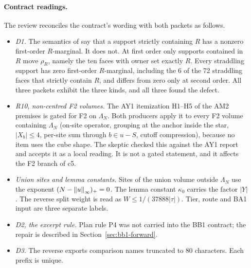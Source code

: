 \paragraph{Contract readings.} The review reconciles the contract's wording
with both packets as follows.
\begin{itemize}
\item \emph{D1.} The semantics of  say
 that a support strictly containing $R$ has a nonzero first-order
 $R$-marginal. It does not. At first order only supports contained in $R$
 move $\rho_R$, namely the ten faces with owner set exactly $R$. Every
 straddling support has zero first-order $R$-marginal, including the 6 of
 the 72 straddling faces that strictly contain $R$, and differs from zero
 only at second order. All three packets exhibit the three kinds, and all
 three found the defect.
\item \emph{R10, non-centred F2 volumes.} The AY1 itemization H1--H5 of the
 AM2 premises is gated for F2 on $\Lambda_N$. Both producers apply it to every
 F2 volume containing $\Lambda_N$ (on-site operator, grouping at the anchor
 inside the star, $|X_b|\le4$, per-site sum through $b\in u-S$, cutoff
 compression), because no item uses the cube shape. The skeptic checked this
 against the AY1 report and accepts it as a local reading. It is not a gated
 statement, and it affects the F2 branch of c5.
\item \emph{Union sites and lemma constants.} Sites of the union volume
 outside $\Lambda_N$ use the exponent $(N-\left\lVert u\right\rVert_\infty)_+=0$. The lemma
 constant $\kappa_0$ carries the factor $|Y|$. The reverse split weight is
 read as $W\le1/(37888|\tau|)$. Tier, route and BA1 input are three separate
 labels.
\item \emph{D2, the excerpt rule.} Plan rule P4 was not carried into the BB1
 contract; the repair is described in Section~\ref{sec:bb1-forward}.
\item \emph{D3.} The reverse exports comparison names truncated to 80
 characters. Each prefix is unique.
\end{itemize}

